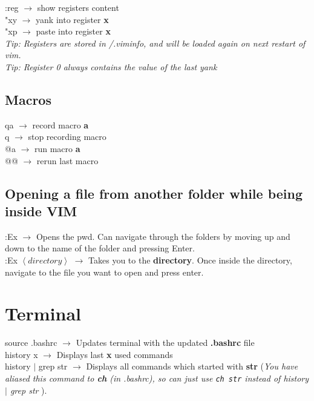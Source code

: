 \documentclass[twoside,a4paper]{article}
\newcommand{\tcb}{\color{blue}}
\newcommand{\tcc}{\color{cyan}}
\newcommand{\tcr}{\color{red}}
\newcommand{\tcg}{\color{gray}}
\newcommand{\tck}{\color{black}}
\newcommand{\ra }{$\rightarrow$ }
\newcommand{\hs}{\hspace}
\begin{document}
\begin{multicols}{2}
		\tcr :reg \tck \ra show registers 
		content\\
		\tcr "xy \tck \ra yank into register 
		\textbf{x}\\
		\tcr "xp \tck \ra paste into register 
		\textbf{x}\\

		\tcg \textit{Tip: Registers are stored in /.viminfo,
		and will be loaded again on next restart of vim.}\\
		\textit{Tip: Register 0 always contains the value of the last 
		yank}

	\tcc \subsection{Macros}

		\tcr qa \tck \ra record macro 
		\textbf{a}\\
		\tcr q \tck \ra stop recording macro\\
		\tcr @a \tck \ra run macro \textbf{a}\\
		\tcr @@ \tck \ra rerun last macro

	\tcc \subsection{Opening a file from another folder while being
	inside VIM}
		\tcr :Ex \tck \ra Opens the pwd. Can 
		navigate through the folders by moving up and down to the name
		of the folder and pressing Enter.\\
		\tcr :Ex \color{ blue} $\left< directory \right>$
		\tck \ra Takes you to the \textbf{directory}.
		Once inside the directory, navigate to the file you want to 
		open and press enter.
\newpage
\tcc \section{Terminal}
	\hs{-0.5 cm}\tcr  source \tcb  .bashrc \tck 
	\ra Updates terminal with the updated \textbf{.bashrc} file\\
	\tcr history \tcb  x \tck \ra Displays
	last \textbf{x} used commands\\
	\tcr history \tcb  $\vert$ grep str \tck 
	\ra Displays all commands which started with \textbf{str}
	(\tcg  \textit{You have aliased this command to \textbf{ch}
	(in .bashrc), so can just use \texttt{ch str} instead of history
	$\vert$ grep str} ).\\


\end{multicols}
\end{document}
